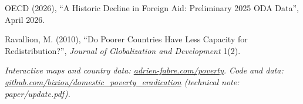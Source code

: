 \documentclass[11pt,english]{article}
\begin{document}
OECD (2026), ``A Historic Decline in Foreign Aid: Preliminary 2025 ODA Data'', April 2026.

Ravallion, M. (2010), ``Do Poorer Countries Have Less Capacity for Redistribution?'', \emph{Journal of Globalization and Development} 1(2).

\emph{Interactive maps and country data: \href{https://adrien-fabre.com/poverty}{adrien-fabre.com/poverty}. Code and data: \href{https://github.com/bixiou/domestic_poverty_eradication}{github.com/bixiou/domestic\_poverty\_eradication} (technical note: paper/update.pdf).}

\endgroup
\end{document}
